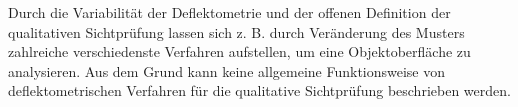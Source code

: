 
\noindent
Durch die Variabilität der Deflektometrie und der offenen Definition der qualitativen Sichtprüfung lassen sich z. B. durch Veränderung des Musters zahlreiche verschiedenste Verfahren aufstellen, um eine Objektoberfläche zu analysieren.
Aus dem Grund kann keine allgemeine Funktionsweise von deflektometrischen Verfahren für die qualitative Sichtprüfung beschrieben werden.
